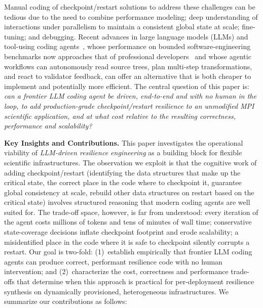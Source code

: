 \documentclass[conference]{IEEEtran}
\begin{document}
Manual coding of checkpoint/restart solutions to address these challenges can be tedious due to the need to combine performance modeling;
deep understanding of interactions under parallelism to maintain a consistent
global state at scale; fine-tuning; and debugging. Recent advances in large language models (LLMs) and tool-using coding agents~\cite{opencode}, whose performance on bounded software-engineering benchmarks now approaches that of professional developers~\cite{jimenez2024swebench} and whose agentic workflows can autonomously read source trees, plan multi-step transformations, and react to validator feedback, can offer an alternative that is both cheaper to implement and potentially more efficient. The central question of this paper is: \emph{can a frontier LLM coding agent be driven, end-to-end and with no human in the loop, to add production-grade checkpoint/restart resilience to an unmodified MPI scientific application, and at what cost relative to the resulting correctness, performance and scalability?}

\textbf{Key Insights and Contributions.}
This paper investigates the operational viability of \emph{LLM-driven resilience engineering} as a building block for flexible scientific infrastructures. The observation we exploit is that the cognitive work of adding checkpoint/restart (identifying the data structures that make up the critical state, the correct place in the code where to checkpoint it, guarantee global consistency at scale, rebuild other data structures on restart based on the critical state) involves structured reasoning that modern coding agents are well suited for. The trade-off space, however, is far from understood: every iteration of the agent costs millions of tokens and tens of minutes of wall time; conservative state-coverage decisions inflate checkpoint footprint and erode scalability; a misidentified place in the code where it is safe to checkpoint silently corrupts a restart. Our goal is two-fold: (1)~establish empirically that frontier LLM coding agents can produce correct, performant resilience code with no human intervention; and (2)~characterize the cost, correctness and performance trade-offs that determine when this approach is practical for per-deployment resilience synthesis on dynamically provisioned, heterogeneous infrastructures. We summarize our contributions as follows:
\end{document}
